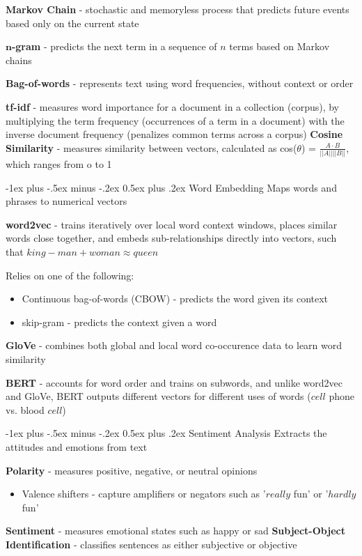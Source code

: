\documentclass[10pt,landscape]{article}
\makeatletter
\renewcommand{\subsection}{\@startsection{subsection}{2}{0mm}%
                                {-1ex plus -.5ex minus -.2ex}%
                                {0.5ex plus .2ex}%
                                {\normalfont\normalsize\bfseries}}
\makeatother
\begin{document}
\begin{multicols}{3}
    \textbf{Markov Chain} - stochastic and memoryless process that predicts future events based only on the current state

    $\boldsymbol{n}$\textbf{-gram} - predicts the next term in a sequence of $n$ terms based on Markov chains

    \textbf{Bag-of-words} - represents text using word frequencies, without context or order

    \textbf{tf-idf} - measures word importance for a document in a collection (corpus), by multiplying the term frequency (occurrences of a term in a document) with the inverse document frequency (penalizes common terms across a corpus)
    \textbf{Cosine Similarity} - measures similarity between vectors, calculated as cos($\theta$) =
    $\frac{A\cdot B}{||A||||B||} $, which ranges from o to 1

    \subsection{Word Embedding}
    Maps words and phrases to numerical vectors

    \textbf{word2vec} - trains iteratively over local  word context windows, places similar words close together, and embeds sub-relationships directly into vectors, such that $king - man + woman \approx queen$

    Relies on one of the following:
    \begin{itemize}[label={--},leftmargin=4mm]
        \itemsep -.4mm
        \item Continuous bag-of-words (CBOW) - predicts the word given its context
        \item skip-gram - predicts the context given a word
    \end{itemize}

    \textbf{GloVe} - combines both global and local word co-occurence data to learn word similarity

    \textbf{BERT} - accounts for word order and trains on subwords, and unlike word2vec and GloVe, BERT outputs different vectors for different uses of words ($cell$ phone vs. blood $cell$)

    \subsection{Sentiment Analysis}
    Extracts the attitudes and emotions from text

    \textbf{Polarity} - measures positive, negative, or neutral opinions
    \begin{itemize}[label={--},leftmargin=4mm]
        \itemsep -.4mm
        \item Valence shifters - capture amplifiers or negators such as '$really$ fun' or '$hardly$ fun'
    \end{itemize}
    \textbf{Sentiment} - measures emotional states such as happy or sad
    \textbf{Subject-Object Identification} - classifies sentences as either subjective or objective

\end{multicols}
\end{document}

